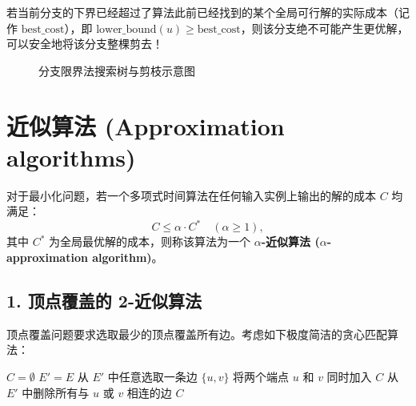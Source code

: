 若当前分支的下界已经超过了算法此前已经找到的某个全局可行解的实际成本（记作 $\text{best\_cost}$），即 $\text{lower\_bound}(u) \ge \text{best\_cost}$，则该分支绝不可能产生更优解，可以安全地将该分支整棵剪去！

\begin{figure}[htbp]
\centering
{}
\caption{分支限界法搜索树与剪枝示意图}
\label{fig:branch_and_bound}
\end{figure}

\section{近似算法 (Approximation algorithms)}

对于最小化问题，若一个多项式时间算法在任何输入实例上输出的解的成本 $C$ 均满足：
\[
C \le \alpha \cdot C^* \quad (\alpha \ge 1),
\]
其中 $C^*$ 为全局最优解的成本，则称该算法为一个 \textbf{$\alpha$-近似算法 ($\alpha$-approximation algorithm)}。

\subsection*{1. 顶点覆盖的 2-近似算法}
顶点覆盖问题要求选取最少的顶点覆盖所有边。考虑如下极度简洁的贪心匹配算法：

\begin{tcolorbox}[colback=white,colframe=gray!50!black,title={\textbf{算法}\quad 顶点覆盖的 2-近似算法}]
\begin{algorithmic}[1]
\State $C = \emptyset$
\State $E' = E$
    \State 从 $E'$ 中任意选取一条边 $\{u, v\}$
    \State 将两个端点 $u$ 和 $v$ 同时加入 $C$
    \State 从 $E'$ 中删除所有与 $u$ 或 $v$ 相连的边
\EndWhile
\State \Return $C$
\end{algorithmic}
\end{tcolorbox}

